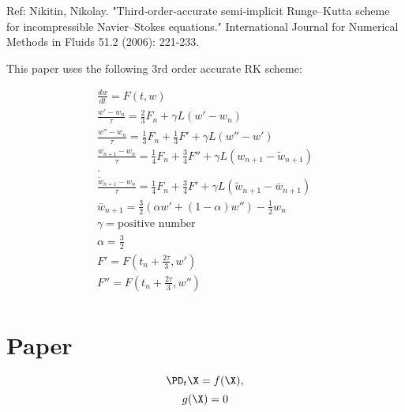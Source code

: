 \documentclass[11pt]{article}
\begin{document}
Ref: Nikitin, Nikolay. "Third‐order‐accurate semi‐implicit Runge–Kutta scheme for incompressible Navier–Stokes equations." International Journal for Numerical Methods in Fluids 51.2 (2006): 221-233.

This paper uses the following 3rd order accurate RK scheme:

\begin{equation}\begin{aligned}
  \frac{dw}{dt} = F(t,w) \\
  \frac{w'-w_n}{\tau} = \frac{2}{3} F_n + \gamma L(w' - w_n) \\
  \frac{w''-w_n}{\tau} = \frac{1}{3} F_n + \frac{1}{3} F' + \gamma L(w'' - w') \\
  \frac{w_{n+1}        -w_n}{\tau} = \frac{1}{4} F_n + \frac{3}{4} F'' + \gamma L(w_{n+1} - \tilde{w}_{n+1}) \\
  . \\
  \frac{\tilde{w}_{n+1}-w_n}{\tau} = \frac{1}{4} F_n + \frac{3}{4} F'  + \gamma L(\tilde{w}_{n+1} - \bar{w}_{n+1}) \\
  \bar{w}_{n+1} = \frac{3}{2} (\alpha w' + (1-\alpha) w'') - \frac{1}{2} w_n \\
  \gamma = \text{positive number} \\
  \alpha = \frac{3}{2} \\
  F' = F(t_n + \frac{2\tau}{3},w') \\
  F'' = F(t_n + \frac{2\tau}{3},w'') \\
\end{aligned}\end{equation}


\newpage
\section{Paper}

\begin{equation}
  \PD_t \X = f(\X),
\end{equation}
\begin{equation}
  g(\X) = 0
\end{equation}
\end{document}
